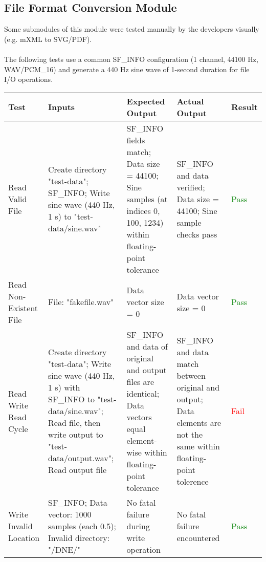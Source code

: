 \documentclass[12pt, titlepage]{article}
\begin{document}
\subsection{File Format Conversion Module}
Some submodules of this module were tested manually by the developers visually (e.g. mXML to SVG/PDF). \\ \\
The following tests use a common SF\_INFO configuration (1 channel, 44100 Hz, WAV/PCM\_16) and generate a 440 Hz sine wave of 1-second duration for file I/O operations.

\begin{longtable}{|L{3cm}|L{3cm}|L{2.5cm}|L{2.5cm}|l|}
  \hline
  \textbf{Test} & \textbf{Inputs} & \textbf{Expected Output} & \textbf{Actual Output} & \textbf{Result} \\
  \hline
  Read Valid File & 
    Create directory "test-data"; \newline
    SF\_INFO; \newline
    Write sine wave (440 Hz, 1 s) to "test-data/sine.wav" & 
    SF\_INFO fields match; \newline
    Data size = 44100; \newline
    Sine samples (at indices 0, 100, 1234) within floating-point tolerance & 
    SF\_INFO and data verified; \newline
    Data size = 44100; \newline
    Sine sample checks pass & \textcolor{green}{Pass} \\
  \hline
  Read Non-Existent File & 
    File: "fakefile.wav" & 
    Data vector size = 0 & 
    Data vector size = 0 & \textcolor{green}{Pass} \\
  \hline
  Read Write Read Cycle & 
    Create directory "test-data"; \newline
    Write sine wave (440 Hz, 1 s) with SF\_INFO to "test-data/sine.wav"; \newline
    Read file, then write output to "test-data/output.wav"; \newline
    Read output file & 
    SF\_INFO and data of original and output files are identical; \newline
    Data vectors equal element-wise within floating-point tolerance & 
    SF\_INFO and data match between original and output; \newline
    Data elements are not the same within floating-point tolerence & 
    \textcolor{red}{Fail} \\
  \hline
  Write Invalid Location & 
    SF\_INFO; \newline
    Data vector: 1000 samples (each 0.5); \newline
    Invalid directory: "/DNE/" & 
    No fatal failure during write operation & 
    No fatal failure encountered & \textcolor{green}{Pass} \\
  \hline
\end{longtable}
\end{document}
